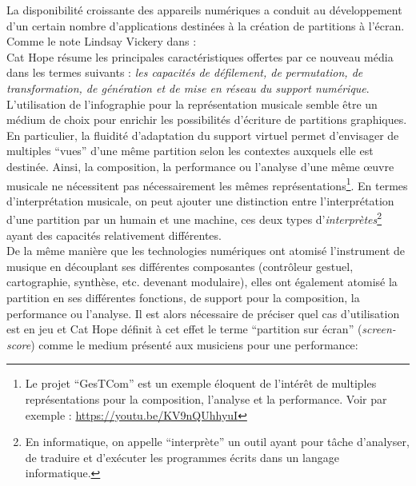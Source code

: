 \noindent La disponibilité croissante des appareils numériques a conduit au développement d'un certain nombre d'applications destinées à la création de partitions à l'écran. Comme le note Lindsay Vickery dans \cite{vickery_limitations_2014} : \\
\indent Cat Hope résume les principales caractéristiques offertes par ce nouveau média dans les termes suivants \cite{hope_screen_2011}: \textit{les capacités de défilement, de permutation, de transformation, de génération et de mise en réseau du support numérique}.\\
\indent L'utilisation de l'infographie pour la représentation musicale semble être un médium de choix pour enrichir les possibilités d'écriture de partitions graphiques. En particulier, la fluidité d'adaptation du support virtuel permet d'envisager de multiples ``vues'' d'une même partition selon les contextes auxquels elle est destinée. Ainsi, la composition, la performance ou l'analyse d'une même œuvre musicale ne nécessitent pas nécessairement les mêmes représentations\footnote{Le projet ``GesTCom'' \cite{antoniadis_gesture_2014} est un exemple éloquent de l'intérêt de multiples représentations pour la composition, l'analyse et la performance. Voir par exemple : \url{https://youtu.be/KV9nQUhhyuI}}. En termes d'interprétation musicale, on peut ajouter une distinction entre l'interprétation d'une partition par un humain et une machine, ces deux types d'\textit{interprètes}\footnote{En informatique, on appelle ``interprète'' un outil ayant pour tâche d'analyser, de traduire et d'exécuter les programmes écrits dans un langage informatique.} ayant des capacités relativement différentes.\\
\indent De la même manière que les technologies numériques ont atomisé l'instrument de musique en découplant ses différentes composantes (contrôleur gestuel, cartographie, synthèse, etc. devenant modulaire), elles ont également atomisé la partition en ses différentes fonctions, de support pour la composition, la performance ou l'analyse. Il est alors nécessaire de préciser quel cas d'utilisation est en jeu et Cat Hope définit à cet effet le terme ``partition sur écran'' (\textit{screen-score}) \cite{hope_screen_2011} comme le medium présenté aux musiciens pour une performance: \\
